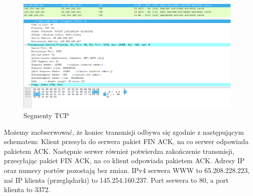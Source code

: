 \documentclass[polish, a4paper]{article}
\begin{document}
\begin{figure}[H]
\centering
\includegraphics[width=\textwidth]{koniec.png}
\caption{Segmenty TCP}
\end{figure}

Możemy zaobserwować, że koniec transmisji odbywa się zgodnie z następującym schematem: Klient przesyła do serwera pakiet FIN ACK, na co serwer odpowiada pakietem ACK. Następnie serwer również potwierdza zakończenie transmisji, przesyłając pakiet FIN ACK, na co klient odpowiada pakietem ACK. Adresy IP oraz numery portów pozostają bez zmian. IPv4 serwera WWW to 65.208.228.223, zaś IP klienta (przeglądarki) to 145.254.160.237. Port serwera to 80, a port klienta to 3372. 
\end{document}
